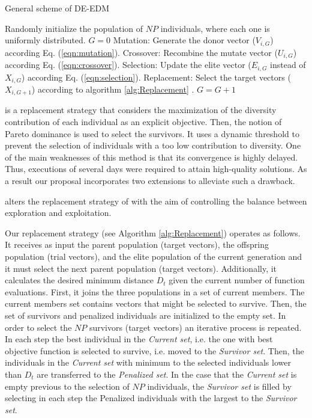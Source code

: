 \begin{algorithm}[H]
  \scriptsize
	\caption{General scheme of DE-EDM} 
	\begin{algorithmic}[1]
	\STATE Randomly initialize the population of $NP$ individuals, where each one is uniformly distributed.
	\STATE $G=0$
		\STATE Mutation: Generate the donor vector ($V_{i,G}$) according Eq. (\ref{eqn:mutation}).
		\STATE Crossover: Recombine the mutate vector ($U_{i,G}$) according Eq. (\ref{eqn:crossover}).
		\STATE Selection: Update the elite vector ($E_{i,G}$ instead of $X_{i,G}$) according Eq. (\ref{eqn:selection}).
		\STATE Replacement: Select the target vectors ($X_{i,G+1}$) according to algorithm \ref{alg:Replacement} .
	   \ENDFOR
	   \STATE $G=G+1$
	\ENDWHILE
    \label{alg:Fase_Remplazo_VSD-MOEAD}
\end{algorithmic}
\end{algorithm}



\RMDDC{} is a replacement strategy that considers the maximization of the diversity 
contribution of each individual as an explicit objective.
%
Then, the notion of Pareto dominance is used to select the survivors.
%
It uses a dynamic threshold to prevent the selection of individuals with a too low contribution to diversity.
%
One of the main weaknesses of this method is that its convergence is highly delayed.
%
Thus, executions of several days were required to attain high-quality solutions.
%
As a result our proposal incorporates two extensions to alleviate such a drawback.

\DEEDM{} alters the replacement strategy of \DE{} with the aim of controlling the 
balance between exploration and exploitation.
%
%

Our replacement strategy (see Algorithm \ref{alg:Replacement}) operates as follows.
%
It receives as input the parent population (target vectors), the offspring population (trial vectors), and the elite population of the current generation and
it must select the next parent population (target vectors).
%
Additionally, it calculates the desired minimum distance $D_t$ given the current number of function evaluations.
%
First, it joins the three populations in a set of current members.
%
The current members set contains vectors that might be selected to survive.
%
Then, the set of survivors and penalized individuals are initialized to the empty set.
%
In order to select the $NP$ survivors (target vectors) an iterative process is repeated.
%
In each step the best individual in the \textit{Current set}, i.e. the one with best objective function is selected
to survive, i.e. moved to the \textit{Survivor set}.
%
Then, the individuals in the \textit{Current set} with minimum \DCN{} to the selected individuals lower than $D_t$ are transferred to the
\textit{Penalized set}.
%
In the case that the \textit{Current set} is empty previous to the selection of $NP$ individuals, the \textit{Survivor set} is filled by selecting in each step the Penalized individuals with the largest \DCN{} to the \textit{Survivor set}.


